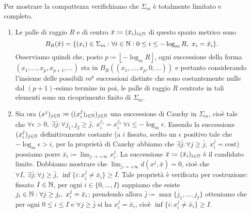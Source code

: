 Per mostrare la compattezza verifichiamo che $ \Sigma_m $ è totalmente limitato e completo.
\begin{enumerate}
    \item Le palle di raggio $ R $ e di centro $ \bar{x} \coloneqq (\bar{x}_i)_{i \in \mathbb{N}} $ di questo spazio metrico sono
    \[
    B_R(\bar{x}) = \{(x_i) \in \Sigma_m : \forall i \in \mathbb{N} : 0 \leq i \leq -\log_m{R}, \ x_i = \bar{x}_i\}.
    \] 
    Osserviamo quindi che, posto $ p \coloneqq \left \lfloor -\log_m{R} \right \rfloor $, ogni successione della forma \linebreak $ (x_1, \ldots, x_p, x_{p+1}, \ldots) $ sta in $ B_R{\left((x_1, \ldots, x_p, 0, \ldots)\right)} $ e pertanto considerando l'insieme delle possibili $ m^p $ successioni distinte che sono costantemente nulle dal $ (p+1) $-esimo termine in poi, le palle di raggio $ R $ centrate in tali elementi sono un ricoprimento finito di $ \Sigma_m $. 
    \item Sia ora $ (x^j)_{j \in \mathbb{N}} \coloneqq ((x_i^j)_{i \in \mathbb{N}})_{j \in \mathbb{N}} $ una successione di Cauchy in $ \Sigma_m $, cioè tale che $ \forall \epsilon > 0, \ \exists \bar{j} : \forall j_1, j_2 \geq \bar{j}, \ x_i^{j_1} = x_i^{j_2} \ \forall i \leq -\log_m{\epsilon} $. Essendo la successione $ (x_i^j)_{j \in \mathbb{N}} $ definitivamente costante (a $ i $ fissato, scelto un $ \epsilon $ positivo tale che $ -\log_m{\epsilon} > i $, per la proprietà di Cauchy abbiamo che $ \exists \bar{j} : \forall j \geq \bar{j}, \ x_i^j = \text{cost} $) possiamo porre $ \bar{x}_i \coloneqq \lim_{j \to +\infty} x_i^j $. La successione $ \bar{x} \coloneqq (\bar{x}_i)_{i \in \mathbb{N}} $ è il candidato limite. Dobbiamo mostrare che $ \lim_{j \to +\infty} d(x^j, \bar{x}) = 0 $, cioè che $ \forall I, \ \exists \bar{j} : \forall j \geq \bar{j}, \ \inf{\{i : x_i^j \neq \bar{x}_i\}} \geq I $. Tale proprietà è verificata per costruzione: fissato $ I \in \mathbb{N} $, per ogni $ i \in \{0, \ldots, I\} $ sappiamo che esiste $ j_i \in \mathbb{N} : \forall j \geq j_i, \ x_i^j = \bar{x}_i $; prendendo allora $ \bar{j} \coloneqq \max \{j_1, \ldots, j_I\} $ otteniamo che per ogni $ 0 \leq i \leq I $ e $ \forall j \geq \bar{j} $ si ha $ x_i^j = \bar{x}_i $, cioè $ \inf{\{i : x_i^j \neq \bar{x}_i\}} \geq I $.
\end{enumerate} 

